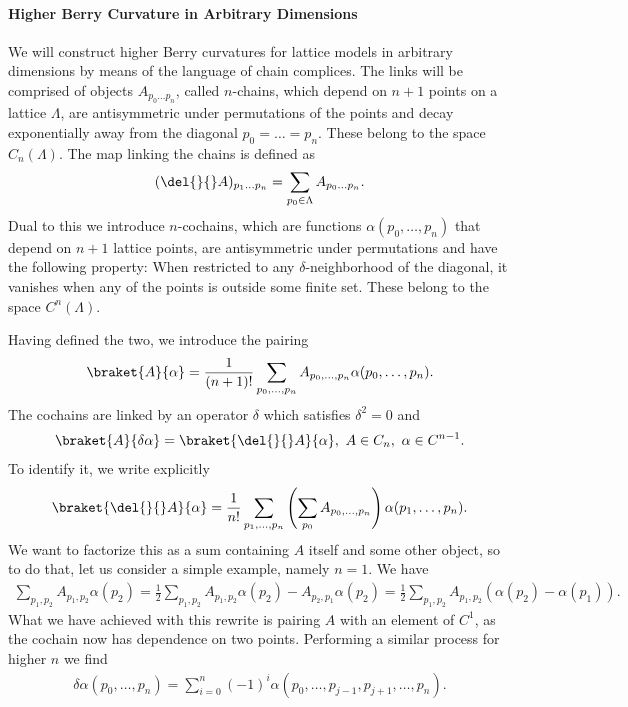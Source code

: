 \paragraph{Higher Berry Curvature in Arbitrary Dimensions}
We will construct higher Berry curvatures for lattice models in arbitrary dimensions by means of the language of chain complices. The links will be comprised of objects $A_{p_{0}\dots p_{n}}$, called $n$-chains, which depend on $n + 1$ points on a lattice $\Lambda$, are antisymmetric under permutations of the points and decay exponentially away from the diagonal $p_{0} = \dots = p_{n}$. These belong to the space $C_{n}(\Lambda)$. The map linking the chains is defined as
\begin{align*}
	(\del{}{}A)_{p_{1}\dots p_{n}} = \sum\limits_{p_{0}\in\Lambda}A_{p_{0}\dots p_{n}}.
\end{align*}
Dual to this we introduce $n$-cochains, which are functions $\alpha(p_{0}, \dots, p_{n})$ that depend on $n + 1$ lattice points, are antisymmetric under permutations and have the following property: When restricted to any $\delta$-neighborhood of the diagonal, it vanishes when any of the points is outside some finite set. These belong to the space $C^{n}(\Lambda)$.

Having defined the two, we introduce the pairing
\begin{align*}
	\braket{A}{\alpha} = \frac{1}{(n + 1)!}\sum\limits_{p_{0}, \dots, p_{n}}A_{p_{0}, \dots, p_{n}}\alpha(p_{0}, \dots, p_{n}).
\end{align*}
The cochains are linked by an operator $\delta$ which satisfies $\delta^{2} = 0$ and
\begin{align*}
	\braket{A}{\delta\alpha} = \braket{\del{}{}A}{\alpha},\ A\in C_{n},\ \alpha\in C^{n - 1}.
\end{align*}
To identify it, we write explicitly
\begin{align*}
	\braket{\del{}{}A}{\alpha} = \frac{1}{n!}\sum\limits_{p_{1}, \dots, p_{n}}\left(\sum\limits_{p_{0}}A_{p_{0}, \dots, p_{n}}\right)\alpha(p_{1}, \dots, p_{n}).
\end{align*}
We want to factorize this as a sum containing $A$ itself and some other object, so to do that, let us consider a simple example, namely $n = 1$. We have
\begin{align*}
	\sum\limits_{p_{1}, p_{2}}A_{p_{1}, p_{2}}\alpha(p_{2}) = \frac{1}{2}\sum\limits_{p_{1}, p_{2}}A_{p_{1}, p_{2}}\alpha(p_{2}) - A_{p_{2}, p_{1}}\alpha(p_{2}) = \frac{1}{2}\sum\limits_{p_{1}, p_{2}}A_{p_{1}, p_{2}}(\alpha(p_{2}) - \alpha(p_{1})).
\end{align*}
What we have achieved with this rewrite is pairing $A$ with an element of $C^{1}$, as the cochain now has dependence on two points. Performing a similar process for higher $n$ we find
\begin{align*}
	\delta\alpha(p_{0}, \dots, p_{n}) = \sum\limits_{i = 0}^{n}(-1)^{i}\alpha(p_{0}, \dots, p_{j - 1}, p_{j + 1}, \dots, p_{n}).
\end{align*}

